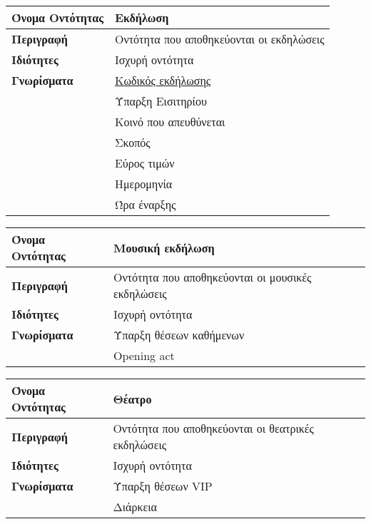 \begin{center}
\begin{tabular}[]{|p{4cm}|p{10cm}|}
\hline
\textbf{Όνομα Οντότητας}   &  Εκδήλωση  \\ \hline 
\textbf{Περιγραφή}         &  Οντότητα που αποθηκεύονται οι εκδηλώσεις \\ \hline 
\textbf{Ιδιότητες}         &  Ισχυρή οντότητα \\  \hline               
\textbf{Γνωρίσματα}        &  \underline{Κωδικός εκδήλωσης} \\
            ~              &  Ύπαρξη Εισιτηρίου \\
             ~             &  Κοινό που απευθύνεται \\
              ~            &  Σκοπός \\ 
                           &  Εύρος τιμών \\
                           &  Ημερομηνία \\
                           &  Ώρα έναρξης\\
 \hline
\end{tabular}
\vspace{0.3 cm}

\begin{tabular}[]{|p{4cm}|p{10cm}|}
 \hline
\textbf{Όνομα Οντότητας}   &  Μουσική εκδήλωση  \\ \hline 
\textbf{Περιγραφή}         &  Οντότητα που αποθηκεύονται οι μουσικές εκδηλώσεις \\ \hline 
\textbf{Ιδιότητες}         &  Ισχυρή οντότητα \\  \hline               
\textbf{Γνωρίσματα}        &  Ύπαρξη θέσεων καθήμενων \\
                           &  Opening act \\
 \hline
\end{tabular}
\vspace{0.3 cm}

\begin{tabular}[]{|p{4cm}|p{10cm}|}
\hline
\textbf{Όνομα Οντότητας}   &  Θέατρο \\ \hline 
\textbf{Περιγραφή}         &  Οντότητα που αποθηκεύονται οι θεατρικές εκδηλώσεις \\ \hline 
\textbf{Ιδιότητες}         &  Ισχυρή οντότητα \\  \hline               
\textbf{Γνωρίσματα}        &  Ύπαρξη θέσεων VIP \\
                           &  Διάρκεια \\
\hline
\end{tabular}
\vspace{0.3 cm}


\end{center}
